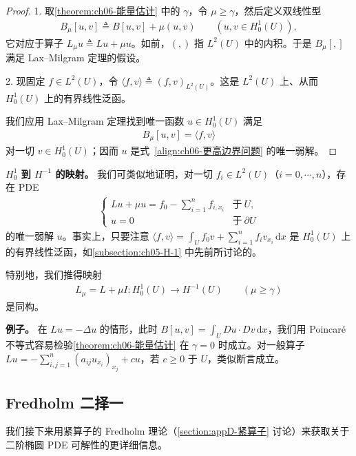 \documentclass[../../main.tex]{subfiles}
\begin{document}
\begin{proof}
1. 取\cref{theorem:ch06-能量估计} 中的 $\gamma$，令 $\mu\geqslant\gamma$，然后定义双线性型
\begin{align*}
B_{\mu}[u,v]\triangleq B[u,v]+\mu(u,v)\qquad (u,v\in H^{1}_{0}(U)),
\end{align*}
它对应于算子 $L_{\mu}u\triangleq Lu+\mu u$。如前，$(,)$ 指 $L^{2}(U)$ 中的内积。于是 $B_{\mu}[,]$ 满足 Lax--Milgram 定理的假设。

2. 现固定 $f\in L^{2}(U)$，令 $\langle f,v\rangle\triangleq(f,v)_{L^{2}(U)}$。这是 $L^{2}(U)$ 上、从而 $H^{1}_{0}(U)$ 上的有界线性泛函。

我们应用 Lax--Milgram 定理找到唯一函数 $u\in H^{1}_{0}(U)$ 满足
\begin{align*}
B_{\mu}[u,v]=\langle f,v\rangle
\end{align*}
对一切 $v\in H^{1}_{0}(U)$；因而 $u$ 是式~\eqref{align:ch06-更高边界问题} 的唯一弱解。
\end{proof}

\textbf{$H^{1}_{0}$ 到 $H^{-1}$ 的映射。} 我们可类似地证明，对一切 $f_{i}\in L^{2}(U)$（$i=0,\cdots,n$），存在 PDE
\begin{align}
\begin{cases}
Lu+\mu u=f_{0}-\sum_{i=1}^{n}f_{i,x_{i}} & \text{于}\ U,\\
u=0 & \text{于}\ \partial U
\end{cases}
\end{align}
的唯一弱解 $u$。事实上，只要注意 $\langle f,v\rangle=\int_{U}f_{0}v+\sum_{i=1}^{n}f_{i}v_{x_{i}}\,\mathrm{d}x$ 是 $H^{1}_{0}(U)$ 上的有界线性泛函，如\cref{subsection:ch05-H-1} 中先前所讨论的。

特别地，我们推得映射
\begin{align*}
L_{\mu}=L+\mu I:H^{1}_{0}(U)\to H^{-1}(U)\qquad (\mu\geqslant\gamma)
\end{align*}
是同构。

\textbf{例子。} 在 $Lu=-\Delta u$ 的情形，此时 $B[u,v]=\int_{U}Du\cdot Dv\,\mathrm{d}x$，我们用 Poincaré 不等式容易检验\cref{theorem:ch06-能量估计} 在 $\gamma=0$ 时成立。对一般算子 $Lu=-\sum_{i,j=1}^{n}(a_{ij}u_{x_{i}})_{x_{j}}+cu$，若 $c\geqslant 0$ 于 $U$，类似断言成立。

\subsection{Fredholm 二择一}\label{subsection:ch06-Fredholm}

我们接下来用紧算子的 Fredholm 理论（\cref{section:appD-紧算子} 讨论）来获取关于二阶椭圆 PDE 可解性的更详细信息。
\end{document}
